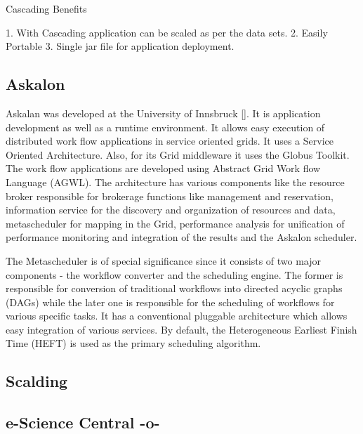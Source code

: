 Cascading Benefits
    
1. With Cascading application can be scaled as per the data sets.
2. Easily Portable
3. Single jar file for application deployment.



\subsection{Askalon}

Askalan was developed at the University of
Innsbruck [\cite{RMBDP-Book}].  It is application development as well as
a runtime environment. It allows easy execution of distributed work
flow applications in service oriented grids. It uses a Service
Oriented Architecture. Also, for its Grid middleware it uses the
Globus Toolkit. The work flow applications are developed using
Abstract Grid Work flow Language (AGWL). The architecture has various
components like the resource broker responsible for brokerage
functions like management and reservation, information service for the
discovery and organization of resources and data, metascheduler for
mapping in the Grid, performance analysis for unification of
performance monitoring and integration of the results and the Askalon
scheduler.

The Metascheduler is of special significance since it consists of two
major components - the workflow converter and the scheduling
engine. The former is responsible for conversion of traditional
workflows into directed acyclic graphs (DAGs) while the later one is
responsible for the scheduling of workflows for various specific
tasks. It has a conventional pluggable architecture which allows easy
integration of various services. By default, the Heterogeneous
Earliest Finish Time (HEFT) is used as the primary scheduling
algorithm.

\subsection{Scalding}

\subsection{e-Science Central -o-}

